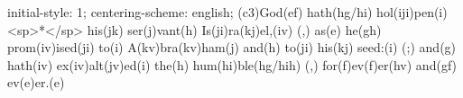 initial-style: 1;
centering-scheme: english;
(c3)God(ef) hath(hg/hi) hol(iji)pen(i) <sp>*</sp> his(jk) ser(j)vant(h) Is(ji)ra(kj)el,(iv) (,) as(e) he(gh) prom(iv)ised(ji) to(i) A(kv)bra(kv)ham(j) and(h) to(ji) his(kj) seed:(i) (;) and(g) hath(iv) ex(iv)alt(jv)ed(i) the(h) hum(hi)ble(hg/hih) (,) for(f)ev(f)er(hv) and(gf) ev(e)er.(e)